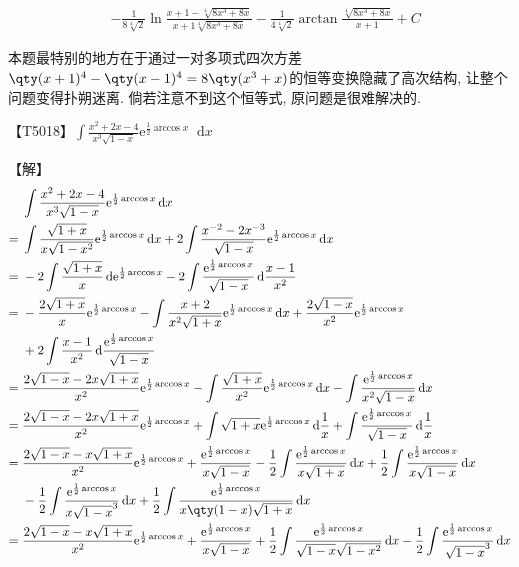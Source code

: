\documentclass{ctexbook}
\newcommand{\e}{\mathrm{e}}
\newcommand*{\dif}{\mathop{}\!\mathrm{d}}
\begin{document}
{\begin{align*}
{}&-\frac{1}{8\sqrt[4]{2}}\ln{\frac{x+1-\sqrt[4]{8x^{3}+8x}}{x+1\sqrt[4]{8x^{3}+8x}}}-\frac{1}{4\sqrt[4]{2}}\arctan{\frac{\sqrt[4]{8x^{3}+8x}}{x+1}}+C
\end{align*}\par
{\kaishu 本题最特别的地方在于通过一对多项式四次方差$\qty(x+1)^{4}-\qty(x-1)^{4}=8\qty(x^{3}+x)$的恒等变换隐藏了高次结构, 让整个问题变得扑朔迷离. 倘若注意不到这个恒等式, 原问题是很难解决的. \par}
【T5018】$\int\frac{x^{2}+2x-4}{x^{3}\sqrt{1-x}}\e^{\frac{1}{2}\arccos{x}}\dif{x}$\par
【解】
\begin{align*}
{}&\int\frac{x^{2}+2x-4}{x^{3}\sqrt{1-x}}\e^{\frac{1}{2}\arccos{x}}\dif{x}\\
={}&\int\frac{\sqrt{1+x}}{x\sqrt{1-x^{2}}}\e^{\frac{1}{2}\arccos{x}}\dif{x}+2\int\frac{x^{-2}-2x^{-3}}{\sqrt{1-x}}\e^{\frac{1}{2}\arccos{x}}\dif{x}\\
={}&-2\int\frac{\sqrt{1+x}}{x}\dif{\e^{\frac{1}{2}\arccos{x}}}-2\int\frac{\e^{\frac{1}{2}\arccos{x}}}{\sqrt{1-x}}\dif{\frac{x-1}{x^{2}}}\\
={}&-\frac{2\sqrt{1+x}}{x}\e^{\frac{1}{2}\arccos{x}}-\int\frac{x+2}{x^{2}\sqrt{1+x}}\e^{\frac{1}{2}\arccos{x}}\dif{x}+\frac{2\sqrt{1-x}}{x^{2}}\e^{\frac{1}{2}\arccos{x}}\\
{}&+2\int\frac{x-1}{x^{2}}\dif{\frac{\e^{\frac{1}{2}\arccos{x}}}{\sqrt{1-x}}}\\
={}&\frac{2\sqrt{1-x}-2x\sqrt{1+x}}{x^{2}}\e^{\frac{1}{2}\arccos{x}}-\int\frac{\sqrt{1+x}}{x^{2}}\e^{\frac{1}{2}\arccos{x}}\dif{x}-\int\frac{\e^{\frac{1}{2}\arccos{x}}}{x^{2}\sqrt{1-x}}\dif{x}\\
={}&\frac{2\sqrt{1-x}-2x\sqrt{1+x}}{x^{2}}\e^{\frac{1}{2}\arccos{x}}+\int\sqrt{1+x}\e^{\frac{1}{2}\arccos{x}}\dif{\frac{1}{x}}+\int\frac{\e^{\frac{1}{2}\arccos{x}}}{\sqrt{1-x}}\dif{\frac{1}{x}}\\
={}&\frac{2\sqrt{1-x}-x\sqrt{1+x}}{x^{2}}\e^{\frac{1}{2}\arccos{x}}+\frac{\e^{\frac{1}{2}\arccos{x}}}{x\sqrt{1-x}}-\frac{1}{2}\int\frac{\e^{\frac{1}{2}\arccos{x}}}{x\sqrt{1+x}}\dif{x}+\frac{1}{2}\int\frac{\e^{\frac{1}{2}\arccos{x}}}{x\sqrt{1-x}}\dif{x}\\
{}&-\frac{1}{2}\int\frac{\e^{\frac{1}{2}\arccos{x}}}{x\sqrt{1-x}^{3}}\dif{x}+\frac{1}{2}\int\frac{\e^{\frac{1}{2}\arccos{x}}}{x\qty(1-x)\sqrt{1+x}}\dif{x}\\
={}&\frac{2\sqrt{1-x}-x\sqrt{1+x}}{x^{2}}\e^{\frac{1}{2}\arccos{x}}+\frac{\e^{\frac{1}{2}\arccos{x}}}{x\sqrt{1-x}}+\frac{1}{2}\int\frac{\e^{\frac{1}{2}\arccos{x}}}{\sqrt{1-x}\sqrt{1-x^{2}}}\dif{x}-\frac{1}{2}\int\frac{\e^{\frac{1}{2}\arccos{x}}}{\sqrt{1-x}^{3}}\dif{x}\\

\end{align*}}
\end{document}
